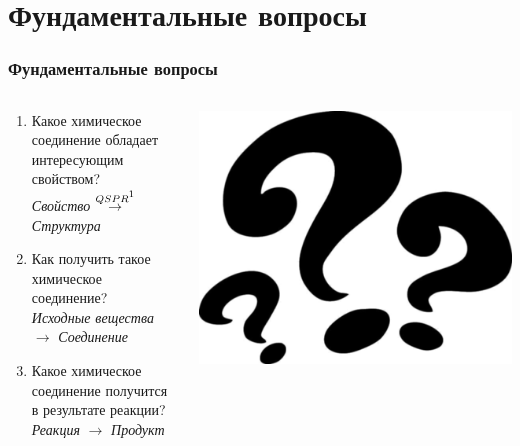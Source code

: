 \section{Фундаментальные вопросы}
\begin{frame}
   \frametitle{Фундаментальные вопросы}
   \begin{columns}
      \begin{column}{0.5\textwidth}
      \begin{enumerate}
         \item Какое {\color{red}химическое соединение} обладает интересующим свойством? \\
            \emph{Свойство} $ \overset{QSPR\footnotemark}{\rightarrow} $ \emph{Структура}
         \item Как получить такое {\color{red}химическое соединение}? \\
            \emph{Исходные вещества} $ \rightarrow $ \emph{Соединение}
         \item Какое {\color{red}химическое соединение} получится в результате реакции? \\
            \emph{Реакция} $ \rightarrow $ \emph{Продукт}
      \end{enumerate}
      \end{column}
      \begin{column}{0.5\textwidth}
         \includegraphics[scale=0.65]{images/question-marks2.png}
      \end{column}
   \end{columns}


\end{frame}

